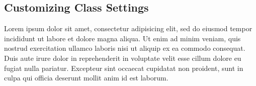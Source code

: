 \documentclass{article}
\begin{document}
\subsection{Customizing Class Settings}
Lorem ipsum dolor sit amet, consectetur adipisicing elit, sed do eiusmod
tempor incididunt ut labore et dolore magna aliqua. Ut enim ad minim veniam,
quis nostrud exercitation ullamco laboris nisi ut aliquip ex ea commodo
consequat. Duis aute irure dolor in reprehenderit in voluptate velit esse
cillum dolore eu fugiat nulla pariatur. Excepteur sint occaecat cupidatat non
proident, sunt in culpa qui officia deserunt mollit anim id est laborum.
\end{document}
